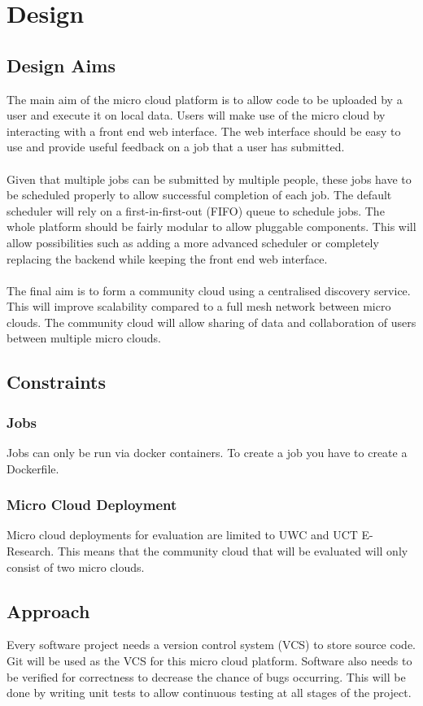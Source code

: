 \documentclass{sig-alternate-05-2015}
\begin{document}
\section{Design}
\subsection{Design Aims}
The main aim of the micro cloud platform is to allow code to be uploaded by a user and execute it on local data. Users will make use of the micro cloud by interacting with a front end web interface. The web interface should be easy to use and provide useful feedback on a job that a user has submitted. 
\\\\
Given that multiple jobs can be submitted by multiple people, these jobs have to be scheduled properly to allow successful completion of each job. The default scheduler will rely on a first-in-first-out (FIFO) queue to schedule jobs. The whole platform should be fairly modular to allow pluggable components. This will allow possibilities such as adding a more advanced scheduler or completely replacing the backend while keeping the front end web interface.
\\\\
The final aim is to form a community cloud using a centralised discovery service. This will improve scalability compared to a full mesh network between micro clouds. The community cloud will allow sharing of data and collaboration of users between multiple micro clouds.

\subsection{Constraints}
\subsubsection{Jobs}
Jobs can only be run via docker containers. To create a job you have to create a Dockerfile.

\subsubsection{Micro Cloud Deployment}
Micro cloud deployments for evaluation are limited to UWC and UCT E-Research. This means that the community cloud that will be evaluated will only consist of two micro clouds.

\subsection{Approach}
Every software project needs a version control system (VCS) to store source code. Git will be used as the VCS for this micro cloud platform. Software also needs to be verified for correctness to decrease the chance of bugs occurring. This will be done by writing unit tests to allow continuous testing at all stages of the project.
\end{document}

